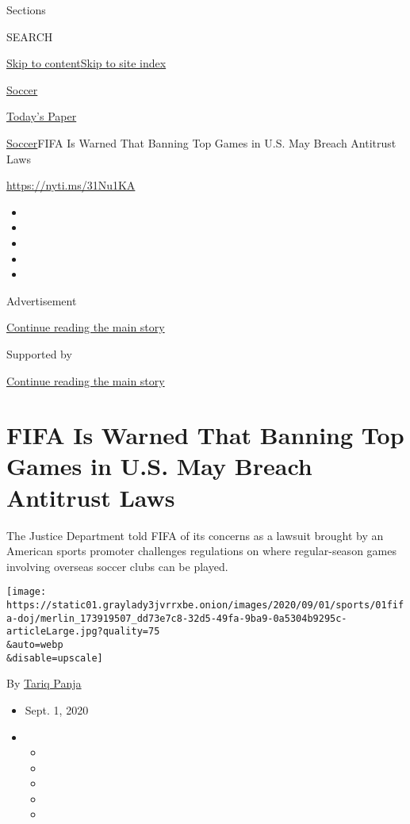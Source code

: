 Sections

SEARCH

\protect\hyperlink{site-content}{Skip to
content}\protect\hyperlink{site-index}{Skip to site index}

\href{https://www.nytimes3xbfgragh.onion/section/sports/soccer}{Soccer}

\href{https://myaccount.nytimes3xbfgragh.onion/auth/login?response_type=cookie\&client_id=vi}{}

\href{https://www.nytimes3xbfgragh.onion/section/todayspaper}{Today's
Paper}

\href{/section/sports/soccer}{Soccer}\textbar{}FIFA Is Warned That
Banning Top Games in U.S. May Breach Antitrust Laws

\url{https://nyti.ms/31Nu1KA}

\begin{itemize}
\item
\item
\item
\item
\item
\end{itemize}

Advertisement

\protect\hyperlink{after-top}{Continue reading the main story}

Supported by

\protect\hyperlink{after-sponsor}{Continue reading the main story}

\hypertarget{fifa-is-warned-that-banning-top-games-in-us-may-breach-antitrust-laws}{%
\section{FIFA Is Warned That Banning Top Games in U.S. May Breach
Antitrust
Laws}\label{fifa-is-warned-that-banning-top-games-in-us-may-breach-antitrust-laws}}

The Justice Department told FIFA of its concerns as a lawsuit brought by
an American sports promoter challenges regulations on where
regular-season games involving overseas soccer clubs can be played.

\texttt{[image: https://static01.graylady3jvrrxbe.onion/images/2020/09/01/sports/01fifa-doj/merlin\_173919507\_dd73e7c8-32d5-49fa-9ba9-0a5304b9295c-articleLarge.jpg?quality=75\\\&auto=webp\\\&disable=upscale]}

By \href{https://www.nytimes3xbfgragh.onion/by/tariq-panja}{Tariq Panja}

\begin{itemize}
\item
  Sept. 1, 2020
\item
  \begin{itemize}
  \item
  \item
  \item
  \item
  \item
  \end{itemize}
\end{itemize}

